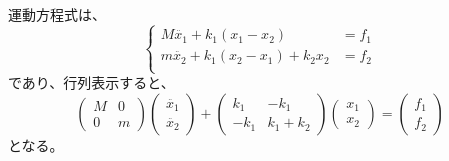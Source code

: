\documentclass[a4paper]{jsarticle}
\begin{document}
\section{}
\subsection{}
運動方程式は、
\begin{equation}
  \begin{cases}
    M \ddot{x_1} + k_1 (x_1 - x_2) &= f_1 \\
    m \ddot{x_2} + k_1 (x_2 - x_1) + k_2 x_2 &= f_2 \\
  \end{cases}
\end{equation}
であり、行列表示すると、
\begin{equation}
  \begin{pmatrix}
    M & 0 \\
    0 & m
  \end{pmatrix}
  \begin{pmatrix}
    \ddot{x_1} \\
    \ddot{x_2}
  \end{pmatrix} +
  \begin{pmatrix}
    k_1 & -k_1 \\
    -k_1 & k_1 + k_2
  \end{pmatrix}
  \begin{pmatrix}
    x_1 \\
    x_2
  \end{pmatrix} =
  \begin{pmatrix}
    f_1 \\
    f_2
  \end{pmatrix}
\end{equation}
となる。
\end{document}
